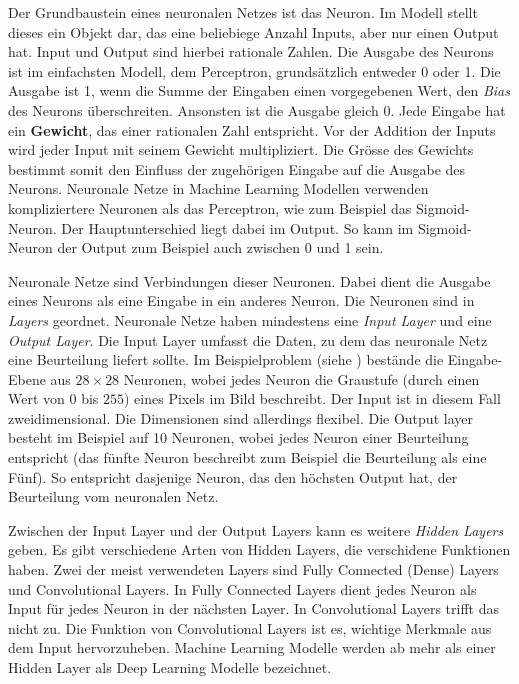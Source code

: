 Der Grundbaustein eines neuronalen Netzes ist das Neuron. Im Modell stellt
dieses ein Objekt dar, das eine beliebiege Anzahl Inputs, aber nur einen Output
hat. Input und Output sind hierbei rationale Zahlen. Die Ausgabe des Neurons ist
im einfachsten Modell, dem Perceptron, grundsätzlich entweder 0 oder 1. Die
Ausgabe ist 1, wenn die Summe der Eingaben einen vorgegebenen Wert, den
\emph{Bias} des Neurons überschreiten. Ansonsten ist die Ausgabe gleich 0. Jede
Eingabe hat ein \textbf{Gewicht}, das einer rationalen Zahl entspricht. Vor der
Addition der Inputs wird jeder Input mit seinem Gewicht multipliziert.  Die
Grösse des Gewichts bestimmt somit den Einfluss der zugehörigen Eingabe auf die
Ausgabe des Neurons. Neuronale Netze in Machine Learning Modellen verwenden
kompliziertere Neuronen als das Perceptron, wie zum Beispiel das Sigmoid-Neuron.
Der Hauptunterschied liegt dabei im Output. So kann im Sigmoid-Neuron der Output
zum Beispiel auch zwischen 0 und 1 sein.

Neuronale Netze sind Verbindungen dieser Neuronen. Dabei dient die Ausgabe eines
Neurons als eine Eingabe in ein anderes Neuron. Die Neuronen sind in
\emph{Layers} geordnet. Neuronale Netze haben mindestens eine \emph{Input Layer}
und eine \emph{Output Layer}. Die Input Layer umfasst die Daten, zu dem das
neuronale Netz eine Beurteilung liefert sollte. Im Beispielproblem (siehe
) bestände die Eingabe-Ebene aus $28\times28$ Neuronen, wobei
jedes Neuron die Graustufe (durch einen Wert von 0 bis $255$) eines Pixels im
Bild beschreibt. Der Input ist in diesem Fall zweidimensional. Die Dimensionen
sind allerdings flexibel. Die Output layer besteht im Beispiel auf 10 Neuronen,
wobei jedes Neuron einer Beurteilung entspricht (das fünfte Neuron beschreibt
zum Beispiel die Beurteilung als eine Fünf). So entspricht dasjenige Neuron, das
den höchsten Output hat, der Beurteilung vom neuronalen Netz.

Zwischen der Input Layer und der Output Layers kann es weitere \emph{Hidden
Layers} geben. Es gibt verschiedene Arten von Hidden Layers, die verschidene
Funktionen haben. Zwei der meist verwendeten Layers sind Fully Connected (Dense)
Layers und Convolutional Layers. In Fully Connected Layers dient jedes Neuron
als Input für jedes Neuron in der nächsten Layer. In Convolutional Layers trifft
das nicht zu. Die Funktion von Convolutional Layers ist es, wichtige Merkmale
aus dem Input hervorzuheben. Machine Learning Modelle werden ab mehr als einer
Hidden Layer als Deep Learning Modelle bezeichnet.



